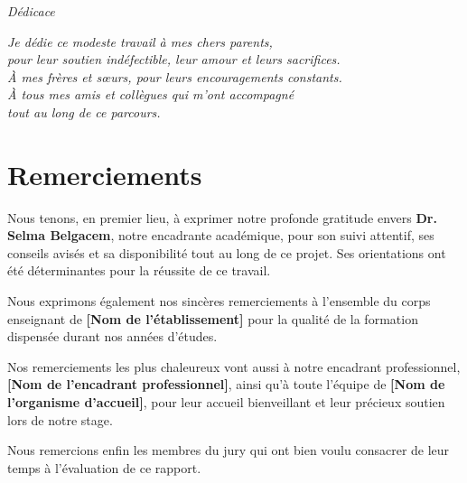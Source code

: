 \documentclass[12pt, a4paper, oneside]{report}
\begin{document}
\pagestyle{empty}
\cleardoublepage
\vspace*{5cm}
\begin{center}
    \textit{\Large\textcolor{primaryblue}{Dédicace}}
\end{center}
\vspace{1cm}
\begin{flushright}
    \textit{Je dédie ce modeste travail à mes chers parents,}\\[0.3cm]
    \textit{pour leur soutien indéfectible, leur amour et leurs sacrifices.}\\[0.3cm]
    \textit{À mes frères et sœurs, pour leurs encouragements constants.}\\[0.3cm]
    \textit{À tous mes amis et collègues qui m'ont accompagné}\\[0.3cm]
    \textit{tout au long de ce parcours.}
\end{flushright}
\newpage

\chapter*{Remerciements}
\pagestyle{empty}

Nous tenons, en premier lieu, à exprimer notre profonde gratitude envers
\textbf{Dr. Selma Belgacem}, notre encadrante académique, pour son suivi attentif,
ses conseils avisés et sa disponibilité tout au long de ce projet. Ses orientations
ont été déterminantes pour la réussite de ce travail.

Nous exprimons également nos sincères remerciements à l'ensemble du corps enseignant
de \textbf{[Nom de l'établissement]} pour la qualité de la formation dispensée durant
nos années d'études.

Nos remerciements les plus chaleureux vont aussi à notre encadrant professionnel,
\textbf{[Nom de l'encadrant professionnel]}, ainsi qu'à toute l'équipe de
\textbf{[Nom de l'organisme d'accueil]}, pour leur accueil bienveillant et leur
précieux soutien lors de notre stage.

Nous remercions enfin les membres du jury qui ont bien voulu consacrer de leur
temps à l'évaluation de ce rapport.
\end{document}
